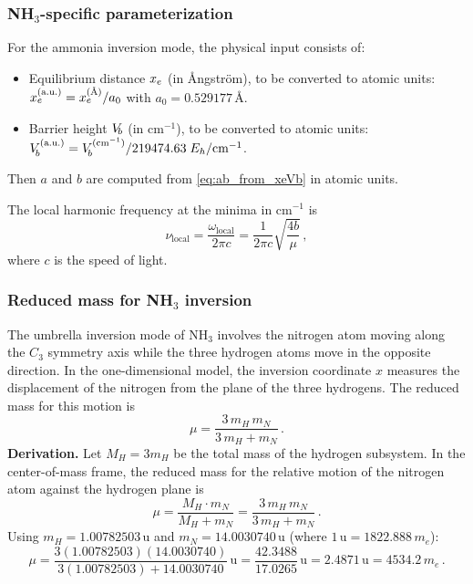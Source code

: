 \subsubsection{NH$_3$-specific parameterization}

For the ammonia inversion mode, the physical input consists of:
\begin{itemize}
  \item Equilibrium distance $x_e$ (in \AA{}ngstr\"om), to be converted to atomic units: $x_e^{\text{(a.u.)}} = x_e^{(\text{\AA})}/a_0$ with $a_0 = 0.529177\,$\AA.
  \item Barrier height $V_{\!b}$ (in cm$^{-1}$), to be converted to atomic units: $V_{\!b}^{\text{(a.u.)}} = V_{\!b}^{(\text{cm}^{-1})} / 219474.63\;E_h/\text{cm}^{-1}$.
\end{itemize}
Then $a$ and $b$ are computed from \cref{eq:ab_from_xeVb} in atomic units.

The local harmonic frequency at the minima in cm$^{-1}$ is
\begin{equation}
  \nu_{\text{local}} = \frac{\omega_{\text{local}}}{2\pi c}
  = \frac{1}{2\pi c}\sqrt{\frac{4b}{\mu}}\,,
\end{equation}
where $c$ is the speed of light.

\subsubsection{Reduced mass for NH$_3$ inversion}

The umbrella inversion mode of NH$_3$ involves the nitrogen atom moving along the
$C_3$ symmetry axis while the three hydrogen atoms move in the opposite direction.
In the one-dimensional model, the inversion coordinate $x$ measures the displacement
of the nitrogen from the plane of the three hydrogens. The reduced mass for this motion is
\begin{equation}
  \boxed{\mu = \frac{3\,m_H\,m_N}{3\,m_H + m_N}\,.}
\end{equation}
\textbf{Derivation.} Let $M_H = 3m_H$ be the total mass of the hydrogen subsystem.
In the center-of-mass frame, the reduced mass for the relative motion of the nitrogen
atom against the hydrogen plane is
\begin{equation}
  \mu = \frac{M_H \cdot m_N}{M_H + m_N} = \frac{3\,m_H\,m_N}{3\,m_H + m_N}\,.
\end{equation}
Using $m_H = 1.00782503\,\text{u}$ and $m_N = 14.0030740\,\text{u}$
(where $1\,\text{u} = 1822.888\,m_e$):
\begin{equation}
  \mu = \frac{3(1.00782503)(14.0030740)}{3(1.00782503) + 14.0030740}\,\text{u}
  = \frac{42.3488}{17.0265}\,\text{u}
  = 2.4871\,\text{u}
  = 4534.2\,m_e\,.
\end{equation}

